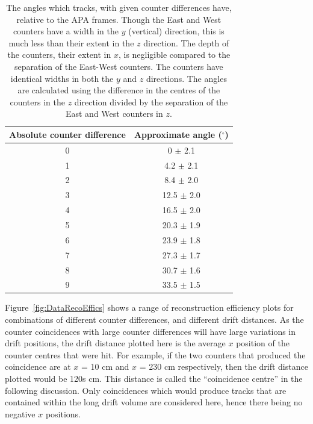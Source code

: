 \begin{table}
\caption[The angles which tracks, with given counter differences have, relative to the APA frames]
        {The angles which tracks, with given counter differences have, relative to the APA frames. Though the East and West counters have a width in the $y$ (vertical) direction, this is much less than their extent in the $z$ direction. The depth of the counters, their extent in $x$, is negligible compared to the separation of the East-West counters. The counters have identical widths in both the $y$ and $z$ directions. The angles are calculated using the difference in the centres of the counters in the $z$ direction divided by the separation of the East and West counters in $z$.}
\centering
\label{tab:CDiffAng}
\begin{tabular}{c c}
\toprule
{Absolute counter difference} & {Approximate angle ($^{\circ}$)} \\ 
\midrule
0 & 0    $\pm$ 2.1 \\

1 & 4.2  $\pm$ 2.1 \\

2 & 8.4  $\pm$ 2.0 \\

3 & 12.5 $\pm$ 2.0 \\

4 & 16.5 $\pm$ 2.0 \\

5 & 20.3 $\pm$ 1.9 \\

6 & 23.9 $\pm$ 1.8 \\

7 & 27.3 $\pm$ 1.7 \\

8 & 30.7 $\pm$ 1.6 \\

9 & 33.5 $\pm$ 1.5 \\
\bottomrule
\end{tabular}
\end{table}

Figure~\ref{fig:DataRecoEffics} shows a range of reconstruction efficiency plots for combinations of different counter differences, and different drift distances. As the counter coincidences with large counter differences will have large variations in drift positions, the drift distance plotted here is the average $x$ position of the counter centres that were hit. For example, if the two counters that produced the coincidence are at $x$ = 10 cm and $x$ = 230 cm respectively, then the drift distance plotted would be 120s cm. This distance is called the ``coincidence centre'' in the following discussion. Only coincidences which would produce tracks that are contained within the long drift volume are considered here, hence there being no negative $x$ positions. \\

